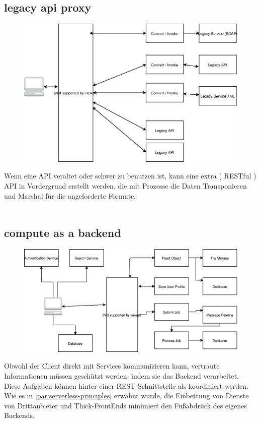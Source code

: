 \documentclass[
12pt,
english,
ngerman,
headsepline,
twoside,
openright,
numbers=noenddot,version=first
]{scrreprt}
\begin{document}
\subsection{legacy api proxy}
\begin{figure}
	\includegraphics[width=0.9\linewidth]{./pics/legacy-api-proxy.eps}
\end{figure}
Wenn eine \acrshort{API} veraltet oder schwer zu benutzen ist, kann eine extra ( RESTful ) \acrshort{API} in Vordergrund erstellt werden, die  mit Prozesse die Daten Transponieren und Marshal für die angeforderte Formate.
\\
\\


\subsection{compute as a backend}
\begin{figure}
	\includegraphics[scale=0.36]{./pics/compute-as-a-backend.eps}
\end{figure}
Obwohl der Client direkt mit Services kommunizieren kann, vertraute Informationen müssen geschützt werden, indem sie das Backend verarbeitet\cite{serverlessArchAWS}. Diese Aufgaben können hinter einer \acrshort{REST} Schnittstelle als koordiniert werden. Wie es in \autoref{par:serverless-principles} erwähnt wurde, die Einbettung von Dienste von Drittanbieter und Thick-FrontEnds minimiert den Fußabdrück des eigenes Backends.
\end{document}
